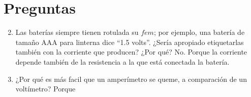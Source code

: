 \documentclass[../main.tex]{subfiles}
\begin{document}
\section{Preguntas}%
\label{sec:preguntas}

\thispagestyle{fancy}

\begin{enumerate}
	\setcounter{enumi}{1}
	\item Las baterías siempre tienen rotulada su $fem$; por ejemplo,
		una batería de tamaño AAA para linterna dice ``1.5 volts''.
		¿Sería apropiado etiquetarlas también con la corriente que producen?
		¿Por qué?
		\subitem No. Porque la corriente depende también de la resistencia a
			la que está conectada la batería.
	\item ¿Por qué es más facil que un amperímetro se queme,
		a comparación de un voltímetro?
		\subitem Porque
\end{enumerate}
\end{document}
